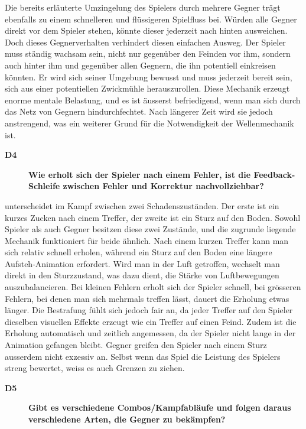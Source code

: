 \documentclass[../Main.tex]{subfiles}
\begin{document}
Die bereits erläuterte Umzingelung des Spielers durch mehrere Gegner trägt ebenfalls zu einem schnelleren und flüssigeren Spielfluss bei. Würden alle Gegner direkt vor dem Spieler stehen, könnte dieser jederzeit nach hinten ausweichen. Doch dieses Gegnerverhalten verhindert diesen einfachen Ausweg. Der Spieler muss ständig wachsam sein, nicht nur gegenüber den Feinden vor ihm, sondern auch hinter ihm und gegenüber allen Gegnern, die ihn potentiell einkreisen könnten. Er wird sich seiner Umgebung bewusst und muss jederzeit bereit sein, sich aus einer potentiellen Zwickmühle herauszurollen. Diese Mechanik erzeugt enorme mentale Belastung, und es ist äusserst befriedigend, wenn man sich durch das Netz von Gegnern hindurchfechtet. Nach längerer Zeit wird sie jedoch anstrengend, was ein weiterer Grund für die Notwendigkeit der Wellenmechanik ist.

\begin{description}
    \item[\textbf{D4}] \textbf{Wie erholt sich der Spieler nach einem Fehler, ist die Feedback-Schleife zwischen Fehler und Korrektur nachvollziehbar?}
\end{description}

 unterscheidet im Kampf zwischen zwei Schadenszuständen. Der erste ist ein kurzes Zucken nach einem Treffer, der zweite ist ein Sturz auf den Boden. Sowohl Spieler als auch Gegner besitzen diese zwei Zustände, und die zugrunde liegende Mechanik funktioniert für beide ähnlich. Nach einem kurzen Treffer kann man sich relativ schnell erholen, während ein Sturz auf den Boden eine längere Aufsteh-Animation erfordert. Wird man in der Luft getroffen, wechselt man direkt in den Sturzzustand, was dazu dient, die Stärke von Luftbewegungen auszubalancieren. Bei kleinen Fehlern erholt sich der Spieler schnell, bei grösseren Fehlern, bei denen man sich mehrmals treffen lässt, dauert die Erholung etwas länger. Die Bestrafung fühlt sich jedoch fair an, da jeder Treffer auf den Spieler dieselben visuellen Effekte erzeugt wie ein Treffer auf einen Feind. Zudem ist die Erholung automatisch und zeitlich angemessen, da der Spieler nicht lange in der Animation gefangen bleibt. Gegner greifen den Spieler nach einem Sturz ausserdem nicht exzessiv an. Selbst wenn das Spiel die Leistung des Spielers streng bewertet, weiss es auch Grenzen zu ziehen.

\begin{description}
    \item[\textbf{D5}] \textbf{Gibt es verschiedene Combos/Kampfabläufe und folgen daraus verschiedene Arten, die Gegner zu bekämpfen?}
\end{description}
\end{document}
